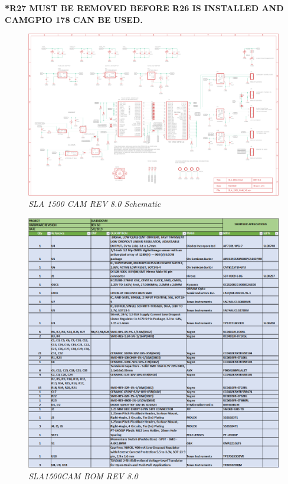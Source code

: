 \documentclass[11pt]{article}
\begin{document}
\textbf{*R27  MUST BE REMOVED BEFORE R26 IS INSTALLED AND CAMGPIO 178 CAN BE USED.}



\begin{landscape}
   \begin{figure}[H]
	\centering	
	\includegraphics[width=9.5in]{SLA1500CAM_V8_sch}
	\caption{\textit{SLA 1500 CAM REV 8.0 Schematic}}	
	\end{figure}
\end{landscape}


    \begin{figure}[H]
	\centering	
	\includegraphics[width=7 in]{SLA1500CAM_BOM_V8}
	\caption{\textit{SLA1500CAM BOM REV 8.0}}	
	\end{figure}
\end{document}
